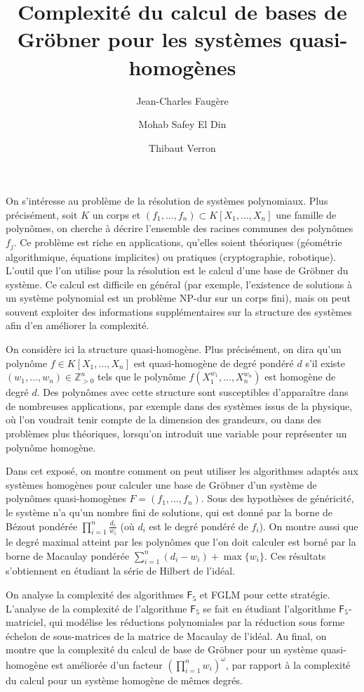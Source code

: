 \documentclass[a4paper,headinclude=false,footinclude=false]{scrartcl}
\title{Complexité du calcul de bases de Gröbner pour les systèmes quasi-homogènes}
\date{}
\author[1]{Jean-Charles Faugère}
\author[1]{Mohab Safey El Din}
\author[1,2]{Thibaut Verron}
\affil[1]{Équipe-projet POLSYS (INRIA/UPMC/LIP6)}
\affil[2]{École Normale Supérieure, Paris}
\newcommand{\F}[1]{\ensuremath{\mathsf{F}_{#1}}}
\begin{document}
\maketitle

On s'intéresse au problème de la résolution de systèmes polynomiaux.
Plus précisément, soit $K$ un corps et $(f_{1},\dots,f_{n}) \subset K[X_{1},\dots,X_{n}]$ une famille de polynômes, on cherche à décrire l'ensemble des racines communes des polynômes $f_{j}$.
Ce problème est riche en applications, qu'elles soient théoriques (géométrie algorithmique, équations implicites) ou pratiques (cryptographie, robotique).
L'outil que l'on utilise pour la résolution est le calcul d'une base de Gröbner du système.
Ce calcul est difficile en général (par exemple, l'existence de solutions à un système polynomial est un problème NP-dur sur un corps fini), mais on peut souvent exploiter des informations supplémentaires sur la structure des systèmes afin d'en améliorer la complexité.

On considère ici la structure quasi-homogène.
Plus précisément, on dira qu'un polynôme $f \in K[X_{1},\dots,X_{n}]$ est quasi-homogène de degré pondéré $d$ s'il existe $(w_{1},\dots,w_{n}) \in \mathbb{Z}_{>0}^{n}$ tels que le polynôme $f(X_{1}^{w_{1}},\dots,X_{n}^{w_{n}})$ est homogène de degré $d$.
Des polynômes avec cette structure sont susceptibles d'apparaître dans de nombreuses applications, par exemple dans des systèmes issus de la physique, où l'on voudrait tenir compte de la dimension des grandeurs, ou dans des problèmes plus théoriques, lorsqu'on introduit une variable pour représenter un polynôme homogène.

Dans cet exposé, on montre comment on peut utiliser les algorithmes adaptés aux systèmes homogènes pour calculer une base de Gröbner d'un système de polynômes quasi-homogènes $F=(f_{1},\dots,f_{n})$.
Sous des hypothèses de généricité, le système n'a qu'un nombre fini de solutions, qui est donné par la borne de Bézout pondérée $\prod_{i=1}^n\frac{d_i}{w_i}$ (où $d_{i}$ est le degré pondéré de $f_{i}$).
On montre aussi que le degré maximal atteint par les polynômes que l'on doit calculer est borné par la borne de Macaulay pondérée $\sum_{i=1}^{n}(d_{i}-w_{i}) + \max\{w_{i}\}$.
Ces résultats s'obtiennent en étudiant la série de Hilbert de l'idéal.

On analyse la complexité des algorithmes \F5 et FGLM pour cette stratégie.
L'analyse de la complexité de l'algorithme \F5 se fait en étudiant l'algorithme \F5-matriciel, qui modélise les réductions polynomiales par la réduction sous forme échelon de sous-matrices de la matrice de Macaulay de l'idéal.
Au final, on montre que la complexité du calcul de base de Gröbner pour un système quasi-homogène est améliorée d'un facteur $\left(\prod_{i=1}^{n} w_{i}\right)^{\omega}$, par rapport à la complexité du calcul pour un système homogène de mêmes degrés.
\end{document}
